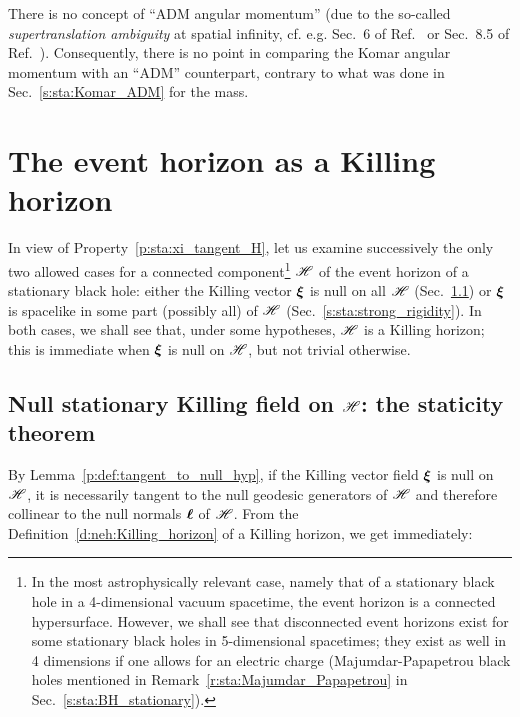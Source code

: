 \begin{remark}
There is no concept of ``ADM angular momentum'' (due to the so-called
\emph{supertranslation ambiguity} at spatial infinity, cf. e.g. Sec.~6 of Ref.~\cite{York79}
or Sec.~8.5 of Ref.~\cite{Gourg12}). Consequently, there is no point in comparing the Komar angular momentum
with an ``ADM'' counterpart, contrary to what was done in Sec.~\ref{s:sta:Komar_ADM} for the mass.
\end{remark}



\section{The event horizon as a Killing horizon} \label{s:sta:EH_KH}

In view of Property~\ref{p:sta:xi_tangent_H}, let us
examine successively the only two allowed cases for a
connected component\footnote{In the most astrophysically relevant case, namely
that of a stationary black hole in a 4-dimensional vacuum spacetime, the event horizon
is a connected hypersurface.
However, we shall see that disconnected event horizons exist for some stationary
black holes in 5-dimensional spacetimes; they exist as well in 4 dimensions if one allows
for an electric charge
(Majumdar-Papapetrou black holes mentioned in
Remark~\ref{r:sta:Majumdar_Papapetrou} in Sec.~\ref{s:sta:BH_stationary}).}
$\mathscr{H}$ of the event horizon of a stationary black hole:
either the Killing vector $\bm{\xi}$ is null on all $\mathscr{H}$
(Sec.~\ref{s:sta:staticity_thm}) or $\bm{\xi}$ is spacelike in some part
(possibly all) of $\mathscr{H}$ (Sec.~\ref{s:sta:strong_rigidity}).
In both cases, we shall see
that, under some hypotheses, $\mathscr{H}$ is a Killing horizon; this is immediate when
$\bm{\xi}$ is null on $\mathscr{H}$, but not trivial otherwise.

\subsection{Null stationary Killing field on \texorpdfstring{$\mathscr{H}$}{H}: the staticity theorem}\label{s:sta:staticity_thm}

By Lemma~\ref{p:def:tangent_to_null_hyp}, if the Killing vector
field $\bm{\xi}$ is null on $\mathscr{H}$, it is necessarily tangent to the null geodesic generators
of $\mathscr{H}$ and therefore collinear to the null normals $\bm{\ell}$ of $\mathscr{H}$.
From the Definition~\ref{d:neh:Killing_horizon} of a Killing horizon, we get immediately:

